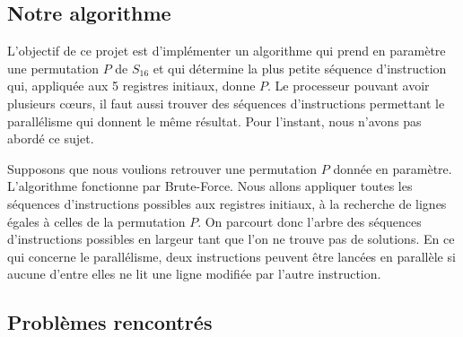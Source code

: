 \documentclass{article}
\begin{document}
\subsection{Notre algorithme}

L'objectif de ce projet est d'implémenter un algorithme qui prend en paramètre une permutation $P$ de $S_{16}$ et qui détermine la plus petite séquence d'instruction qui, appliquée aux 5 registres initiaux, donne $P$. Le processeur pouvant avoir plusieurs cœurs, il faut aussi trouver des séquences d'instructions permettant le parallélisme qui donnent le même résultat. Pour l'instant, nous n'avons pas abordé ce sujet.
       
Supposons que nous voulions retrouver une permutation $P$ donnée en paramètre. L'algorithme fonctionne par Brute-Force. Nous allons appliquer toutes les séquences d'instructions possibles aux registres initiaux, à la recherche de lignes égales à celles de la permutation $P$. On parcourt donc l'arbre des séquences d'instructions possibles en largeur tant que l'on ne trouve pas de solutions. En ce qui concerne le parallélisme, deux instructions peuvent être lancées en parallèle si aucune d'entre elles ne lit une ligne modifiée par l'autre instruction.

\subsection{Problèmes rencontrés}
\end{document}
